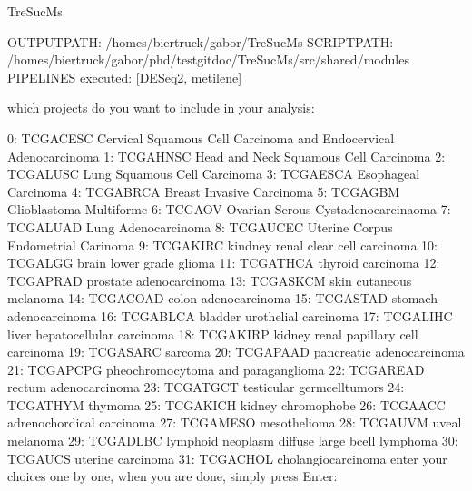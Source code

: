 \documentclass[letterpaper,10pt,english]{sphinxmanual}
\begin{document}
\begin{sphinxVerbatim}[commandchars=\\\{\}]
\PYGZdl{} TreSucMs

 OUTPUT\PYGZus{}PATH:             /homes/biertruck/gabor/TreSucMs
 SCRIPT\PYGZus{}PATH:             /homes/biertruck/gabor/phd/test\PYGZus{}git\PYGZus{}doc/TreSucMs/src/shared/modules
 PIPELINES executed:      [\PYGZsq{}DESeq2\PYGZsq{}, \PYGZsq{}metilene\PYGZsq{}]

 which projects do you want to include in your analysis:

  0:     TCGA\PYGZhy{}CESC           Cervical Squamous Cell Carcinoma and Endocervical Adenocarcinoma
  1:     TCGA\PYGZhy{}HNSC           Head and Neck Squamous Cell Carcinoma
  2:     TCGA\PYGZhy{}LUSC           Lung Squamous Cell Carcinoma
  3:     TCGA\PYGZhy{}ESCA           Esophageal Carcinoma
  4:     TCGA\PYGZhy{}BRCA           Breast Invasive Carcinoma
  5:     TCGA\PYGZhy{}GBM            Glioblastoma Multiforme
  6:     TCGA\PYGZhy{}OV             Ovarian Serous Cystadenocarcinaoma
  7:     TCGA\PYGZhy{}LUAD           Lung Adenocarcinoma
  8:     TCGA\PYGZhy{}UCEC           Uterine Corpus Endometrial Carinoma
  9:     TCGA\PYGZhy{}KIRC           kindney renal clear cell carcinoma
 10:     TCGA\PYGZhy{}LGG            brain lower grade glioma
 11:     TCGA\PYGZhy{}THCA           thyroid carcinoma
 12:     TCGA\PYGZhy{}PRAD           prostate adenocarcinoma
 13:     TCGA\PYGZhy{}SKCM           skin cutaneous melanoma
 14:     TCGA\PYGZhy{}COAD           colon adenocarcinoma
 15:     TCGA\PYGZhy{}STAD           stomach adenocarcinoma
 16:     TCGA\PYGZhy{}BLCA           bladder urothelial carcinoma
 17:     TCGA\PYGZhy{}LIHC           liver hepatocellular carcinoma
 18:     TCGA\PYGZhy{}KIRP           kidney renal papillary cell carcinoma
 19:     TCGA\PYGZhy{}SARC           sarcoma
 20:     TCGA\PYGZhy{}PAAD           pancreatic adenocarcinoma
 21:     TCGA\PYGZhy{}PCPG           pheochromocytoma and paraganglioma
 22:     TCGA\PYGZhy{}READ           rectum adenocarcinoma
 23:     TCGA\PYGZhy{}TGCT           testicular germcelltumors
 24:     TCGA\PYGZhy{}THYM           thymoma
 25:     TCGA\PYGZhy{}KICH           kidney chromophobe
 26:     TCGA\PYGZhy{}ACC            adrenochordical carcinoma
 27:     TCGA\PYGZhy{}MESO           mesothelioma
 28:     TCGA\PYGZhy{}UVM            uveal melanoma
 29:     TCGA\PYGZhy{}DLBC           lymphoid neoplasm diffuse large b\PYGZhy{}cell lymphoma
 30:     TCGA\PYGZhy{}UCS            uterine carcinoma
 31:     TCGA\PYGZhy{}CHOL           cholangiocarcinoma
 enter your choices one by one, when you are done, simply press \PYGZdq{}Enter\PYGZdq{}:
\end{sphinxVerbatim}
\end{document}
